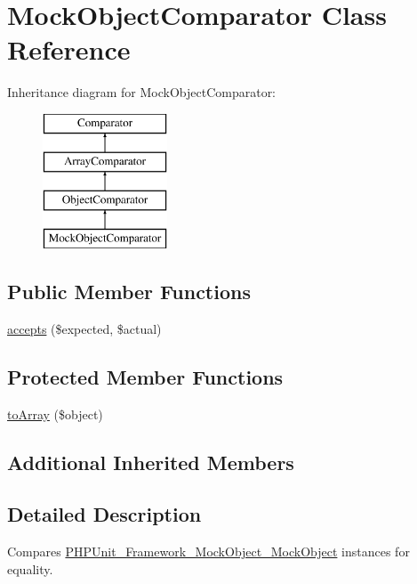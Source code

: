 \hypertarget{class_sebastian_bergmann_1_1_comparator_1_1_mock_object_comparator}{}\section{Mock\+Object\+Comparator Class Reference}
\label{class_sebastian_bergmann_1_1_comparator_1_1_mock_object_comparator}
Inheritance diagram for Mock\+Object\+Comparator\+:\begin{figure}[H]
\begin{center}
\leavevmode
\includegraphics[height=4.000000cm]{class_sebastian_bergmann_1_1_comparator_1_1_mock_object_comparator}
\end{center}
\end{figure}
\subsection*{Public Member Functions}
\begin{DoxyCompactItemize}
\item 
\mbox{\hyperlink{class_sebastian_bergmann_1_1_comparator_1_1_mock_object_comparator_ae9bdf0cba02ce3470169280656cdeb84}{accepts}} (\$expected, \$actual)
\end{DoxyCompactItemize}
\subsection*{Protected Member Functions}
\begin{DoxyCompactItemize}
\item 
\mbox{\hyperlink{class_sebastian_bergmann_1_1_comparator_1_1_mock_object_comparator_afd1cb3de15bd99be95ad5c707a97c493}{to\+Array}} (\$object)
\end{DoxyCompactItemize}
\subsection*{Additional Inherited Members}


\subsection{Detailed Description}
Compares \mbox{\hyperlink{interface_p_h_p_unit___framework___mock_object___mock_object}{P\+H\+P\+Unit\+\_\+\+Framework\+\_\+\+Mock\+Object\+\_\+\+Mock\+Object}} instances for equality. 

